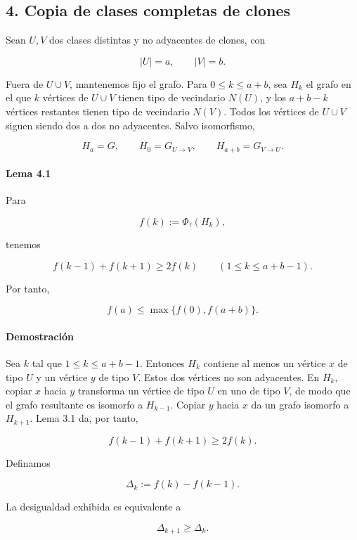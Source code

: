 \documentclass[
  spanish,
  11pt,
  a4paper,
]{article}
\begin{document}
\subsection{4. Copia de clases completas de clones}\label{copia-de-clases-completas-de-clones}

Sean \(U,V\) dos clases distintas y no adyacentes de clones, con

\[
|U|=a,
\qquad
|V|=b.
\]

Fuera de \(U\cup V\), mantenemos fijo el grafo. Para \(0\le k\le a+b\), sea \(H_k\) el grafo en el que \(k\) vértices de \(U\cup V\) tienen tipo de vecindario \(N(U)\), y los \(a+b-k\) vértices restantes tienen tipo de vecindario \(N(V)\). Todos los vértices de \(U\cup V\) siguen siendo dos a dos no adyacentes. Salvo isomorfismo,

\[
H_a=G,
\qquad
H_0=G_{U\to V},
\qquad
H_{a+b}=G_{V\to U}.
\]

\paragraph{Lema 4.1}\label{lema-4.1}

Para

\[
f(k):=\Phi_\tau(H_k),
\]

tenemos

\[
f(k-1)+f(k+1)\ge2f(k)
\qquad
(1\le k\le a+b-1).
\]

Por tanto,

\[
f(a)\le\max\{f(0),f(a+b)\}.
\]

\paragraph{Demostración}\label{demostraciuxf3n-2}

Sea \(k\) tal que \(1\le k\le a+b-1\). Entonces \(H_k\) contiene al menos un vértice \(x\) de tipo \(U\) y un vértice \(y\) de tipo \(V\). Estos dos vértices no son adyacentes. En \(H_k\), copiar \(x\) hacia \(y\) transforma un vértice de tipo \(U\) en uno de tipo \(V\), de modo que el grafo resultante es isomorfo a \(H_{k-1}\). Copiar \(y\) hacia \(x\) da un grafo isomorfo a \(H_{k+1}\). Lema 3.1 da, por tanto,

\[
f(k-1)+f(k+1)\ge2f(k).
\]

Definamos

\[
\Delta_k:=f(k)-f(k-1).
\]

La desigualdad exhibida es equivalente a

\[
\Delta_{k+1}\ge\Delta_k.
\]
\end{document}
